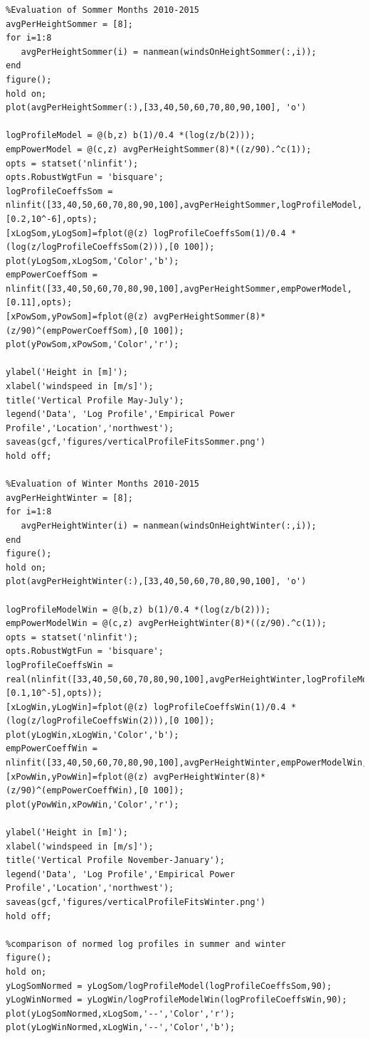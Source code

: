 \documentclass[10pt]{article}
\begin{document}
\begin{lstlisting}
%Evaluation of Sommer Months 2010-2015
avgPerHeightSommer = [8];
for i=1:8
   avgPerHeightSommer(i) = nanmean(windsOnHeightSommer(:,i));
end
figure();
hold on;
plot(avgPerHeightSommer(:),[33,40,50,60,70,80,90,100], 'o')

logProfileModel = @(b,z) b(1)/0.4 *(log(z/b(2)));
empPowerModel = @(c,z) avgPerHeightSommer(8)*((z/90).^c(1));
opts = statset('nlinfit');
opts.RobustWgtFun = 'bisquare';
logProfileCoeffsSom = nlinfit([33,40,50,60,70,80,90,100],avgPerHeightSommer,logProfileModel,[0.2,10^-6],opts);
[xLogSom,yLogSom]=fplot(@(z) logProfileCoeffsSom(1)/0.4 *(log(z/logProfileCoeffsSom(2))),[0 100]);
plot(yLogSom,xLogSom,'Color','b');
empPowerCoeffSom = nlinfit([33,40,50,60,70,80,90,100],avgPerHeightSommer,empPowerModel,[0.11],opts);
[xPowSom,yPowSom]=fplot(@(z) avgPerHeightSommer(8)*(z/90)^(empPowerCoeffSom),[0 100]);
plot(yPowSom,xPowSom,'Color','r');

ylabel('Height in [m]');
xlabel('windspeed in [m/s]');
title('Vertical Profile May-July');
legend('Data', 'Log Profile','Empirical Power Profile','Location','northwest');
saveas(gcf,'figures/verticalProfileFitsSommer.png')
hold off;

%Evaluation of Winter Months 2010-2015
avgPerHeightWinter = [8];
for i=1:8
   avgPerHeightWinter(i) = nanmean(windsOnHeightWinter(:,i));
end
figure();
hold on;
plot(avgPerHeightWinter(:),[33,40,50,60,70,80,90,100], 'o')

logProfileModelWin = @(b,z) b(1)/0.4 *(log(z/b(2)));
empPowerModelWin = @(c,z) avgPerHeightWinter(8)*((z/90).^c(1));
opts = statset('nlinfit');
opts.RobustWgtFun = 'bisquare';
logProfileCoeffsWin = real(nlinfit([33,40,50,60,70,80,90,100],avgPerHeightWinter,logProfileModelWin,[0.1,10^-5],opts));
[xLogWin,yLogWin]=fplot(@(z) logProfileCoeffsWin(1)/0.4 *(log(z/logProfileCoeffsWin(2))),[0 100]);
plot(yLogWin,xLogWin,'Color','b');
empPowerCoeffWin = nlinfit([33,40,50,60,70,80,90,100],avgPerHeightWinter,empPowerModelWin,0.063,opts);
[xPowWin,yPowWin]=fplot(@(z) avgPerHeightWinter(8)*(z/90)^(empPowerCoeffWin),[0 100]);
plot(yPowWin,xPowWin,'Color','r');

ylabel('Height in [m]');
xlabel('windspeed in [m/s]');
title('Vertical Profile November-January');
legend('Data', 'Log Profile','Empirical Power Profile','Location','northwest');
saveas(gcf,'figures/verticalProfileFitsWinter.png')
hold off;

%comparison of normed log profiles in summer and winter
figure();
hold on;
yLogSomNormed = yLogSom/logProfileModel(logProfileCoeffsSom,90);
yLogWinNormed = yLogWin/logProfileModelWin(logProfileCoeffsWin,90);
plot(yLogSomNormed,xLogSom,'--','Color','r');
plot(yLogWinNormed,xLogWin,'--','Color','b');


\end{lstlisting}
\end{document}
